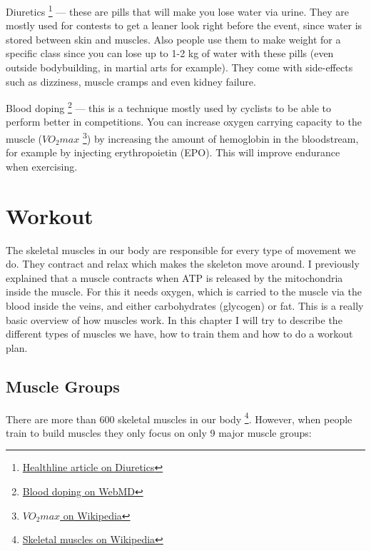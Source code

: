\documentclass[openany, 12pt]{book}
\begin{document}
        Diuretics
        \footnote{\href{https://www.healthline.com/health/diuretics}{Healthline article on Diuretics}}
        --- these are pills that will make you lose water via urine. They are mostly used for contests to get a leaner look right before the event, since water is stored between skin and muscles. Also
        people use them to make weight for a specific class since you can lose up to 1-2 kg of water with these pills (even outside bodybuilding, in martial arts for example). They come with side-effects
        such as dizziness, muscle cramps and even kidney failure.

        Blood doping
        \footnote{\href{https://www.webmd.com/fitness-exercise/blood-doping}{Blood doping on WebMD}}
        --- this is a technique mostly used by cyclists to be able to perform better in competitions. You can increase oxygen carrying capacity to the muscle ($VO_2max$
        \footnote{\href{https://en.wikipedia.org/wiki/VO2_max}{$VO_2max$ on Wikipedia}}) by increasing the amount of
        hemoglobin in the bloodstream, for example by injecting erythropoietin (EPO). This will improve endurance when exercising.

  \chapter{Workout}

        The skeletal muscles in our body are responsible for every type of movement we do. They contract and relax which makes the skeleton move around. I previously explained that
        a muscle contracts when ATP is released by the mitochondria inside the muscle. For this it needs oxygen, which is carried to the muscle via the blood inside the veins, and
        either carbohydrates (glycogen) or fat. This is a really basic overview of how muscles work. In this chapter I will try to describe the different types of muscles we have,
        how to train them and how to do a workout plan.
  
        \section{Muscle Groups}

        There are more than 600 skeletal muscles in our body
        \footnote{\href{https://en.wikipedia.org/wiki/Skeletal_muscle}{Skeletal muscles on Wikipedia}}. However, when people train to build muscles they only
        focus on only 9 major muscle groups:
\end{document}
